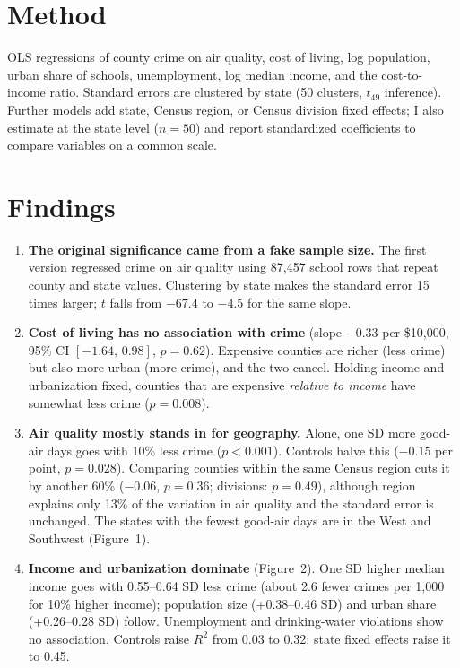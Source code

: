 \documentclass[10pt,letterpaper]{article}
\begin{document}
\section{Method}
OLS regressions of county crime on air quality, cost of living, log population, urban share
of schools, unemployment, log median income, and the cost-to-income ratio. Standard errors
are clustered by state (50 clusters, $t_{49}$ inference). Further models add state, Census
region, or Census division fixed effects; I also estimate at the state level ($n=50$) and
report standardized coefficients to compare variables on a common scale.

\section{Findings}
\begin{enumerate}[label=\textbf{\arabic*.}]
\item \textbf{The original significance came from a fake sample size.} The first version
regressed crime on air quality using 87,457 school rows that repeat county and state values.
Clustering by state makes the standard error 15 times larger; $t$ falls from $-67.4$ to
$-4.5$ for the same slope.
\item \textbf{Cost of living has no association with crime} (slope $-0.33$ per \$10{,}000,
95\% CI $[-1.64,\,0.98]$, $p=0.62$). Expensive counties are richer (less crime) but also more
urban (more crime), and the two cancel. Holding income and urbanization fixed, counties that
are expensive \emph{relative to income} have somewhat less crime ($p=0.008$).
\item \textbf{Air quality mostly stands in for geography.} Alone, one SD more good-air days
goes with 10\% less crime ($p<0.001$). Controls halve this ($-0.15$ per point, $p=0.028$).
Comparing counties within the same Census region cuts it by another 60\% ($-0.06$,
$p=0.36$; divisions: $p=0.49$), although region explains only 13\% of the variation in air
quality and the standard error is unchanged. The states with the fewest good-air days are in
the West and Southwest (Figure~1).
\item \textbf{Income and urbanization dominate} (Figure~2). One SD higher median income goes
with 0.55--0.64 SD less crime (about 2.6 fewer crimes per 1,000 for 10\% higher income);
population size (+0.38--0.46 SD) and urban share (+0.26--0.28 SD) follow. Unemployment and
drinking-water violations show no association. Controls raise $R^2$ from 0.03 to 0.32;
state fixed effects raise it to 0.45.
\end{enumerate}
\end{document}
